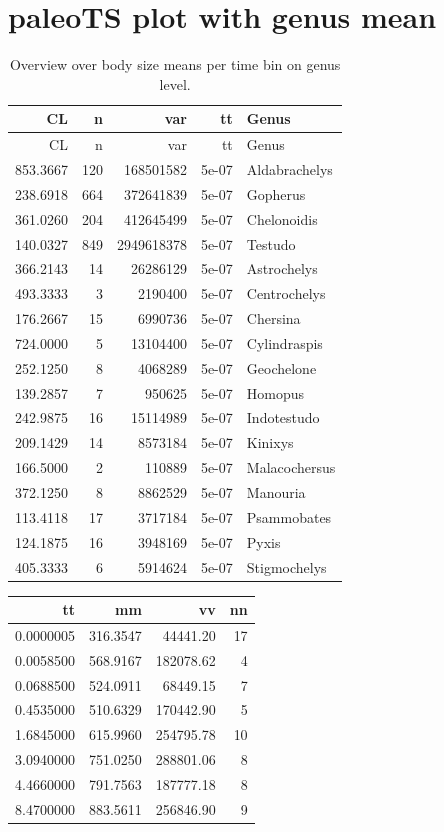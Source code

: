 \documentclass[]{article}
\begin{document}
\newpage

\section{paleoTS plot with genus
mean}\label{paleots-plot-with-genus-mean}

\begin{longtable}[]{@{}rrrrl@{}}
\caption{Overview over body size means per time bin on genus
level.}\tabularnewline
\toprule
CL & n & var & tt & Genus\tabularnewline
\midrule
\endfirsthead
\toprule
CL & n & var & tt & Genus\tabularnewline
\midrule
\endhead
853.3667 & 120 & 168501582 & 5e-07 & Aldabrachelys\tabularnewline
238.6918 & 664 & 372641839 & 5e-07 & Gopherus\tabularnewline
361.0260 & 204 & 412645499 & 5e-07 & Chelonoidis\tabularnewline
140.0327 & 849 & 2949618378 & 5e-07 & Testudo\tabularnewline
366.2143 & 14 & 26286129 & 5e-07 & Astrochelys\tabularnewline
493.3333 & 3 & 2190400 & 5e-07 & Centrochelys\tabularnewline
176.2667 & 15 & 6990736 & 5e-07 & Chersina\tabularnewline
724.0000 & 5 & 13104400 & 5e-07 & Cylindraspis\tabularnewline
252.1250 & 8 & 4068289 & 5e-07 & Geochelone\tabularnewline
139.2857 & 7 & 950625 & 5e-07 & Homopus\tabularnewline
242.9875 & 16 & 15114989 & 5e-07 & Indotestudo\tabularnewline
209.1429 & 14 & 8573184 & 5e-07 & Kinixys\tabularnewline
166.5000 & 2 & 110889 & 5e-07 & Malacochersus\tabularnewline
372.1250 & 8 & 8862529 & 5e-07 & Manouria\tabularnewline
113.4118 & 17 & 3717184 & 5e-07 & Psammobates\tabularnewline
124.1875 & 16 & 3948169 & 5e-07 & Pyxis\tabularnewline
405.3333 & 6 & 5914624 & 5e-07 & Stigmochelys\tabularnewline
\bottomrule
\end{longtable}

\begin{longtable}[]{@{}rrrr@{}}
\toprule
tt & mm & vv & nn\tabularnewline
\midrule
\endhead
0.0000005 & 316.3547 & 44441.20 & 17\tabularnewline
0.0058500 & 568.9167 & 182078.62 & 4\tabularnewline
0.0688500 & 524.0911 & 68449.15 & 7\tabularnewline
0.4535000 & 510.6329 & 170442.90 & 5\tabularnewline
1.6845000 & 615.9960 & 254795.78 & 10\tabularnewline
3.0940000 & 751.0250 & 288801.06 & 8\tabularnewline
4.4660000 & 791.7563 & 187777.18 & 8\tabularnewline
8.4700000 & 883.5611 & 256846.90 & 9\tabularnewline
\bottomrule
\end{longtable}
\end{document}
